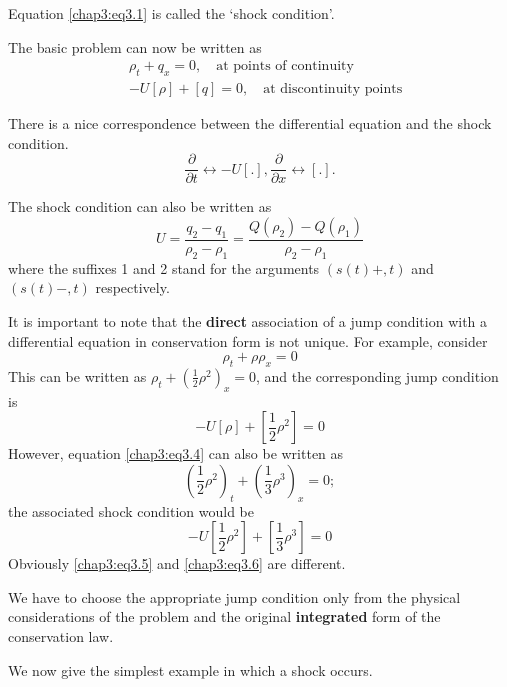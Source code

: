 \noindent Equation \eqref{chap3:eq3.1} is called the `shock condition'.

The basic problem can now be written as 
\begin{equation}
\begin{aligned}
&\rho_t+q_x=0,\quad\text{at points of continuity}\\
& -U[\rho]+[q]=0,\quad\text{at discontinuity points}
\end{aligned}\tag{3.2}\label{chap3:eq3.2}
\end{equation}

There is a nice correspondence between the differential equation and the shock condition.
$$
\frac{\partial}{\partial t}\leftrightarrow -U[.],\frac{\partial}{\partial x} \leftrightarrow [.].
$$\pageoriginale 

The shock condition can also be written as 
\begin{equation}
U=\frac{q_2-q_1}{\rho_2-\rho_1}=\frac{Q(\rho_2)-Q(\rho_1)}{\rho_2-\rho_1} \tag{3.3}\label{chap3:eq3.3}
\end{equation}
where the suffixes 1 and 2 stand for the arguments $(s(t)+,t)$ and $(s(t)-,t)$ respectively.

It is important to note that the {\bf direct} association of a jump condition with a differential equation in conservation form is not unique. For example, consider
\begin{equation}
\rho_t+\rho\rho_x=0\tag{3.4}\label{chap3:eq3.4}
\end{equation}
This can be written as $\rho_t+(\frac{1}{2}\rho^2)_x=0$, and the corresponding jump condition is 
\begin{equation}
-U[\rho]+\left[\frac{1}{2}\rho^2\right]=0\tag{3.5}\label{chap3:eq3.5}
\end{equation}
However, equation \eqref{chap3:eq3.4} can also be written as 
$$
\left(\frac{1}{2}\rho^2\right)_t +\left(\frac{1}{3}\rho^3\right)_x=0;
$$
the associated shock condition would be 
\begin{equation}
-U\left[\frac{1}{2}\rho^2\right]+\left[\frac{1}{3}\rho^3\right]=0 \tag{3.6}\label{chap3:eq3.6}
\end{equation}
Obviously \eqref{chap3:eq3.5} and \eqref{chap3:eq3.6} are different.

We have to choose the appropriate jump condition only from the physical considerations of the problem and the original {\bf integrated} form of the conservation law.

We now give the simplest example in which a shock occurs.

